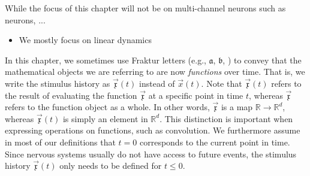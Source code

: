 While the focus of this chapter will not be on multi-channel neurons such as \nlif neurons, ...

\begin{itemize}
	\item We mostly focus on linear dynamics
\end{itemize}

\begin{Notation}
In this chapter, we sometimes use Fraktur letters (e.g., $\mathfrak{a}$, $\mathfrak{b}$, \textellipsis) to convey that the mathematical objects we are referring to are now \emph{functions} over time.
That is, we write the stimulus history as $\vec{\mathfrak{x}}(t)$ instead of $\vec x(t)$.
Note that $\vec{\mathfrak{x}}(t)$ refers to the result of evaluating the function $\vec{\mathfrak{x}}$ at a specific point in time $t$, whereas $\vec{\mathfrak{x}}$ refers to the function object as a whole.
In other words, $\vec{\mathfrak{x}}$ is a map $\mathbb{R} \longrightarrow \mathbb{R}^d$, whereas $\vec{\mathfrak{x}}(t)$ is simply an element in $\mathbb{R}^d$.
This distinction is important when expressing operations on functions, such as convolution.
We furthermore assume in most of our definitions that $t = 0$ corresponds to the current point in time.
Since nervous systems usually do not have access to future events, the stimulus history $\vec{\mathfrak{x}}(t)$ only needs to be defined for $t \leq 0$.
\end{Notation}

